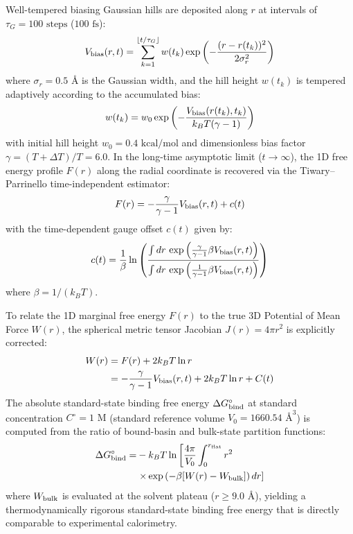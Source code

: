 \documentclass[journal=jpcbfk,manuscript=article,layout=twocolumn]{achemso}
\begin{document}
Well-tempered biasing Gaussian hills are deposited along $r$ at intervals of $\tau_G = 100\text{ steps}$ ($100\text{ fs}$):
\begin{equation}
V_{\rm bias}(r, t) = \sum_{k=1}^{\lfloor t/\tau_G \rfloor} w(t_k) \exp\left( - \frac{(r - r(t_k))^2}{2 \sigma_r^2} \right)
\end{equation}
where $\sigma_r = 0.5\text{ \AA}$ is the Gaussian width, and the hill height $w(t_k)$ is tempered adaptively according to the accumulated bias:
\begin{equation}
w(t_k) = w_0 \exp\left( - \frac{V_{\rm bias}(r(t_k), t_k)}{k_B T (\gamma - 1)} \right)
\end{equation}
with initial hill height $w_0 = 0.4\text{ kcal/mol}$ and dimensionless bias factor $\gamma = (T + \Delta T)/T = 6.0$. In the long-time asymptotic limit ($t \to \infty$), the 1D free energy profile $F(r)$ along the radial coordinate is recovered via the Tiwary--Parrinello time-independent estimator:\cite{tiwary2015time}
\begin{equation}
F(r) = - \frac{\gamma}{\gamma - 1} V_{\rm bias}(r, t) + c(t)
\end{equation}
with the time-dependent gauge offset $c(t)$ given by:
\begin{equation}
c(t) = \frac{1}{\beta} \ln \left( \frac{\int dr \, \exp\left( \frac{\gamma}{\gamma - 1} \beta V_{\rm bias}(r, t) \right)}{\int dr \, \exp\left( \frac{1}{\gamma - 1} \beta V_{\rm bias}(r, t) \right)} \right)
\end{equation}
where $\beta = 1/(k_B T)$.

To relate the 1D marginal free energy $F(r)$ to the true 3D Potential of Mean Force $W(r)$, the spherical metric tensor Jacobian $J(r) = 4\pi r^2$ is explicitly corrected:\cite{tiwary2015time,boresch2003absolute}
\begin{align}
W(r) &= F(r) + 2 k_B T \ln r \nonumber \\
&= - \frac{\gamma}{\gamma - 1} V_{\rm bias}(r, t) + 2 k_B T \ln r + C(t)
\end{align}
The absolute standard-state binding free energy $\Delta G^\circ_{\rm bind}$ at standard concentration $C^\circ = 1\text{ M}$ (standard reference volume $V_0 = 1660.54\text{ \AA}^3$) is computed from the ratio of bound-basin and bulk-state partition functions:\cite{boresch2003absolute,limongelli2013funnel}
\begin{align}
\Delta G^\circ_{\rm bind} = &- k_B T \ln \left[ \frac{4\pi}{V_0} \int_0^{r_{\rm flat}} r^2 \right. \nonumber \\
&\left. \times \exp\left( -\beta [W(r) - W_{\rm bulk}] \right) dr \right]
\end{align}
where $W_{\rm bulk}$ is evaluated at the solvent plateau ($r \ge 9.0\text{ \AA}$), yielding a thermodynamically rigorous standard-state binding free energy that is directly comparable to experimental calorimetry.
\end{document}
